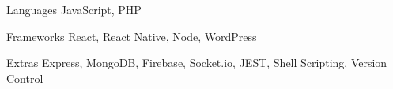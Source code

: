 
\begin{cvskills}
  \cvskill
    {Languages} %
    {JavaScript, PHP} %

  \cvskill
    {Frameworks} %
    {React, React Native, Node, WordPress} %
    
   \cvskill
    {Extras} %
    {Express, MongoDB, Firebase, Socket.io, JEST, Shell Scripting, Version Control} %
\end{cvskills}
